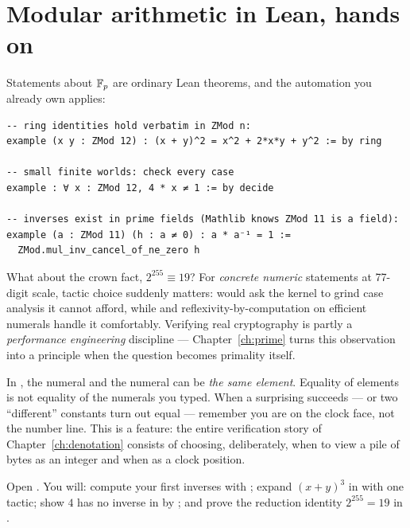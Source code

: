 \section{Modular arithmetic in Lean, hands on}

Statements about $\mathbb{F}_p$ are ordinary Lean theorems, and the automation you
already own applies:

\begin{lstlisting}[language=Lean]
-- ring identities hold verbatim in ZMod n:
example (x y : ZMod 12) : (x + y)^2 = x^2 + 2*x*y + y^2 := by ring

-- small finite worlds: check every case
example : ∀ x : ZMod 12, 4 * x ≠ 1 := by decide

-- inverses exist in prime fields (Mathlib knows ZMod 11 is a field):
example (a : ZMod 11) (h : a ≠ 0) : a * a⁻¹ = 1 :=
  ZMod.mul_inv_cancel_of_ne_zero h
\end{lstlisting}

What about the crown fact, $2^{255} \equiv 19$? For \emph{concrete numeric}
statements at 77-digit scale, tactic choice suddenly matters: 
would ask the kernel to grind case analysis it cannot afford, while
 and reflexivity-by-computation on efficient numerals handle
it comfortably. Verifying real cryptography is partly a \emph{performance
engineering} discipline --- Chapter~\ref{ch:prime} turns this observation
into a principle when the question becomes primality itself.

\begin{pitfall}
In , the numeral  and the numeral
 can be \emph{the same element}. Equality of elements is not
equality of the numerals you typed. When a surprising  succeeds ---
or two ``different'' constants turn out equal --- remember you are on the
clock face, not the number line. This is a feature: the entire verification
story of Chapter~\ref{ch:denotation} consists of choosing, deliberately, when
to view a pile of bytes as an integer and when as a clock position.
\end{pitfall}

\begin{tryit}
Open . You will: compute your first inverses with
; expand $(x+y)^3$ in  with one tactic; show $4$
has no inverse in  by ; and prove the reduction
identity $2^{255} = 19$ in .
\end{tryit}

